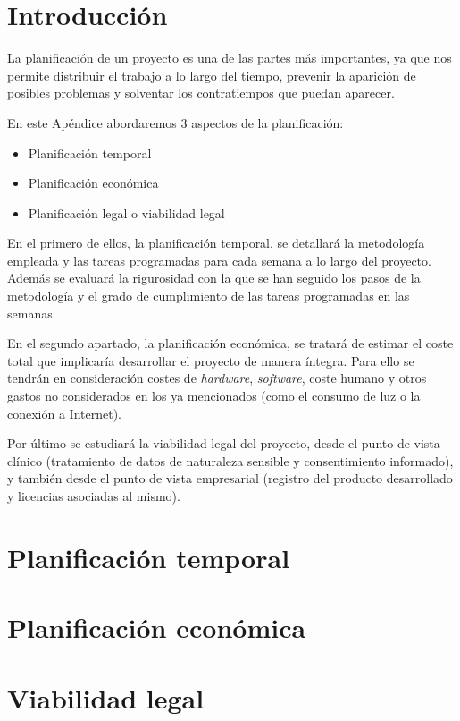 
\section{Introducción}

La planificación de un proyecto es una de las partes más importantes, ya que nos permite distribuir el trabajo a lo largo del tiempo, prevenir la aparición de posibles problemas y solventar los contratiempos que puedan aparecer.

En este Apéndice abordaremos 3 aspectos de la planificación:
\begin{itemize}[itemsep=0.1em]
    \item Planificación temporal
    \item Planificación económica 
    \item Planificación legal o viabilidad legal
\end{itemize}

En el primero de ellos, la planificación temporal, se detallará la metodología empleada y las tareas programadas para cada semana a lo largo del proyecto. Además se evaluará la rigurosidad con la que se han seguido los pasos de la metodología y el grado de cumplimiento de las tareas programadas en las semanas.

En el segundo apartado, la planificación económica, se tratará de estimar el coste total que implicaría desarrollar el proyecto de manera íntegra. Para ello se tendrán en consideración costes de \textit{hardware}, \textit{software}, coste humano y otros gastos no considerados en los ya mencionados (como el consumo de luz o la conexión a Internet).

Por último se estudiará la viabilidad legal del proyecto, desde el punto de vista clínico (tratamiento de datos de naturaleza sensible y consentimiento informado), y también desde el punto de vista empresarial (registro del producto desarrollado y licencias asociadas al mismo).

\section{Planificación temporal}

\section{Planificación económica}

\section{Viabilidad legal}